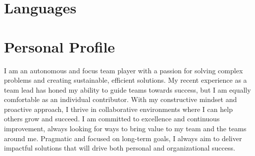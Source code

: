 \documentclass[11pt,a4paper,sans]{moderncv}        %
\begin{document}
\section{Languages}


\section{Personal Profile}
I am an autonomous and focus team player with a passion for solving complex problems and creating sustainable, efficient solutions. My recent experience as a team lead has honed my ability to guide teams towards success, but I am equally comfortable as an individual contributor. \newline
With my constructive mindset and proactive approach, I thrive in collaborative environments where I can help others grow and succeed. I am committed to excellence and continuous improvement, always looking for ways to bring value to my team and the teams around me. Pragmatic and focused on long-term goals, I always aim to deliver impactful solutions that will drive both personal and organizational success.
\end{document}
